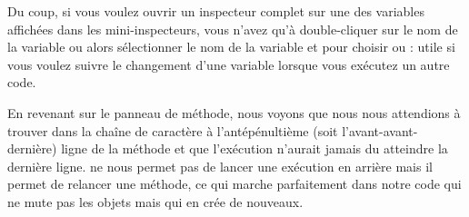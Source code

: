 \documentclass[a4paper,10pt,twoside]{book}
\begin{document}

Du coup, si vous voulez ouvrir un inspecteur complet sur une des variables
affichées dans les mini-inspecteurs, vous n'avez qu'à double-cliquer
sur le nom de la variable ou alors sélectionner le nom de la variable et 
\actclickz pour choisir
  ou :
utile si vous voulez suivre 
le changement d'une variable lorsque vous exécutez un autre code.

En revenant sur le panneau de méthode, nous voyons que nous
nous attendions à trouver  dans la chaîne de caractère
 à l'antépénultième (soit l'avant-avant-dernière) 
ligne de la méthode et que l'exécution n'aurait jamais du atteindre
la dernière ligne.
\pharo ne nous permet pas de lancer une exécution en arrière mais
il permet de relancer une méthode, ce qui marche parfaitement dans
notre code qui ne mute pas les objets mais qui en crée de nouveaux.

\end{document}
